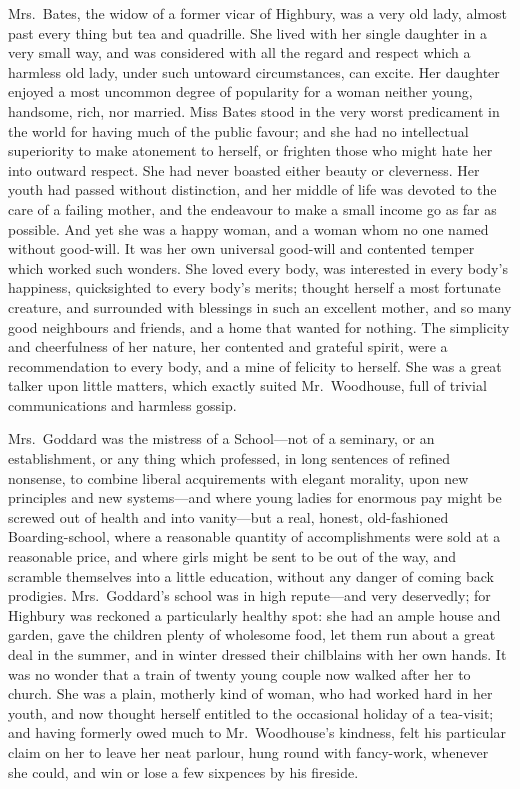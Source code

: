 Mrs.\ Bates, the widow of a former vicar of Highbury, was a
very old lady, almost past every thing but tea and quadrille.
She lived with her single daughter in a very small way, and was
considered with all the regard and respect which a harmless old lady,
under such untoward circumstances, can excite.  Her daughter enjoyed
a most uncommon degree of popularity for a woman neither young,
handsome, rich, nor married.  Miss Bates stood in the very worst
predicament in the world for having much of the public favour;
and she had no intellectual superiority to make atonement to herself,
or frighten those who might hate her into outward respect.
She had never boasted either beauty or cleverness.  Her youth
had passed without distinction, and her middle of life was devoted
to the care of a failing mother, and the endeavour to make a small
income go as far as possible.  And yet she was a happy woman,
and a woman whom no one named without good-will.  It was her own
universal good-will and contented temper which worked such wonders.
She loved every body, was interested in every body's happiness,
quicksighted to every body's merits; thought herself a most fortunate
creature, and surrounded with blessings in such an excellent mother,
and so many good neighbours and friends, and a home that wanted
for nothing.  The simplicity and cheerfulness of her nature,
her contented and grateful spirit, were a recommendation to every body,
and a mine of felicity to herself.  She was a great talker upon
little matters, which exactly suited Mr.\ Woodhouse, full of trivial
communications and harmless gossip.

Mrs.\ Goddard was the mistress of a School---not of a seminary,
or an establishment, or any thing which professed, in long sentences of
refined nonsense, to combine liberal acquirements with elegant morality,
upon new principles and new systems---and where young ladies for
enormous pay might be screwed out of health and into vanity---but
a real, honest, old-fashioned Boarding-school, where a reasonable
quantity of accomplishments were sold at a reasonable price,
and where girls might be sent to be out of the way, and scramble
themselves into a little education, without any danger of coming
back prodigies.  Mrs.\ Goddard's school was in high repute---and
very deservedly; for Highbury was reckoned a particularly healthy
spot: she had an ample house and garden, gave the children plenty
of wholesome food, let them run about a great deal in the summer,
and in winter dressed their chilblains with her own hands.
It was no wonder that a train of twenty young couple now walked
after her to church.  She was a plain, motherly kind of woman,
who had worked hard in her youth, and now thought herself entitled
to the occasional holiday of a tea-visit; and having formerly
owed much to Mr.\ Woodhouse's kindness, felt his particular claim
on her to leave her neat parlour, hung round with fancy-work,
whenever she could, and win or lose a few sixpences by his fireside.

